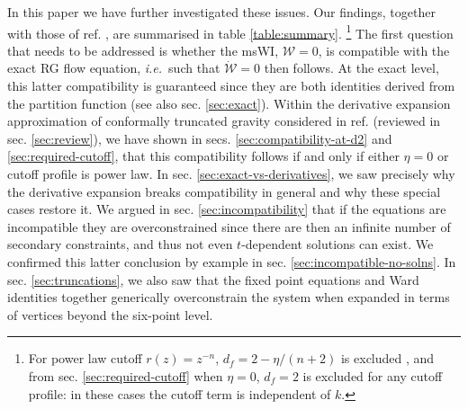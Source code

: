 \documentclass[11pt]{book} %
\newcommand\ie{\textit{i.e.}\ }
\numberwithin{equation}{chapter}
\begin{document}
In this paper we have further investigated these issues.
Our findings, together with those of ref. \cite{Dietz:2015owa}, are summarised in table \ref{table:summary}.
\footnote{For power law cutoff  $r(z)=z^{-n}$, $d_f = 2-\eta/(n+2)$ is excluded \cite{Dietz:2015owa},
and from sec. \ref{sec:required-cutoff} when $\eta=0$,  $d_f=2$ is excluded for any cutoff profile:
in these cases the cutoff term is independent of $k$.}
The first question that needs to be addressed is whether the msWI,
$\mathcal{W}=0$, is compatible with the exact RG flow equation, \ie such that $\dot{\mathcal{W}}=0$ then follows.
At the exact level, this latter compatibility is guaranteed since they are both identities derived from the
partition function (see also sec. \ref{sec:exact}).
Within the derivative expansion approximation of conformally truncated gravity considered in ref.
\cite{Dietz:2015owa} (reviewed in sec. \ref{sec:review}),
we have shown  in secs. \ref{sec:compatibility-at-d2} and \ref{sec:required-cutoff},
that this compatibility follows if and only if either $\eta=0$ or cutoff profile is power law.
In sec. \ref{sec:exact-vs-derivatives}, we saw precisely why the derivative expansion breaks compatibility
in general and why these special cases restore it.
We argued in sec. \ref{sec:incompatibility} that if the equations are incompatible they are overconstrained
since there are then an infinite number of secondary constraints,
and thus not even $t$-dependent solutions can exist.
We confirmed this latter conclusion by example in sec. \ref{sec:incompatible-no-solns}.
In sec. \ref{sec:truncations},
we also saw that the fixed point equations and Ward identities together generically overconstrain the
system when expanded in terms of vertices beyond the six-point level.
\end{document}
